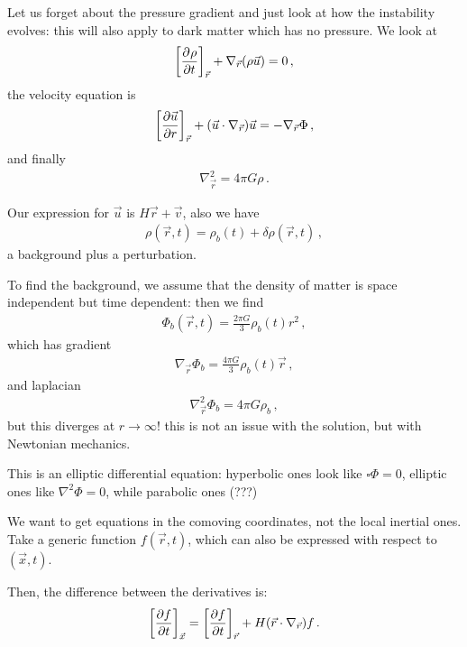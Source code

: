 \documentclass[main.tex]{subfiles}
\begin{document}
Let us forget about the pressure gradient and just look at how the instability evolves: this will also apply to dark matter which has no pressure. We look at 
%
\begin{align}
  \qty[\pdv[]{\rho }{t} ]_{\vec{r}} + \nabla_{\vec{r}} \qty(\rho \vec{u}) = 0 
\,,
\end{align}
%
the velocity equation is 
%
\begin{align}
  \qty[\pdv{\vec{u}}{r}]_{\vec{r}} + \qty(\vec{u} \cdot \nabla_{\vec{r}}) \vec{u} = - \nabla_{\vec{r}} \Phi 
\,,
\end{align}
%
and finally 
%
\begin{align}
  \nabla^2_{\vec{r}} = 4 \pi G \rho 
\,.
\end{align}

Our expression for \(\vec{u}\) is \(H \vec{r} + \vec{v}\), also we have 
%
\begin{align}
  \rho (\vec{r}, t) = \rho_{b} (t) + \delta \rho (\vec{r}, t)
\,,
\end{align}
%
a background plus a perturbation. 

To find the background, we assume that the density of matter is space independent but time dependent: then we find 
%
\begin{align}
  \Phi_{b } (\vec{r}, t) = \frac{2 \pi G}{3} \rho_{b} (t) r^2
\,,
\end{align}
%
which has gradient 
%
\begin{align}
  \nabla_{\vec{r}} \Phi_{b} = \frac{4 \pi G}{3} \rho_b (t) \vec{r} 
\,,
\end{align}
%
and laplacian 
%
\begin{align}
  \nabla^2_{\vec{r}} \Phi_{b} = 4 \pi G \rho_b
\,,
\end{align}
%
but this diverges at \(r \rightarrow \infty\)! this is not an issue with the solution, but with Newtonian mechanics. 

This is an elliptic differential equation: hyperbolic ones look like \( \square \Phi = 0\), elliptic ones like \(\nabla^2 \Phi =0  \), while parabolic ones (???)

We want to get equations in the comoving coordinates, not the local inertial ones. Take a generic function \(f(\vec{r}, t)\), which can also be expressed with respect to \((\vec{x}, t)\). 

Then, the difference between the derivatives is: 
%
\begin{align} \label{eq:comoving-derivatives-relation}
  \qty[\pdv{f}{t}]_{\vec{x}} =   \qty[\pdv{f}{t}]_{\vec{r}} + H \qty(\vec{r} \cdot \nabla_{\vec{r}}) f
\,.
\end{align}
\end{document}
